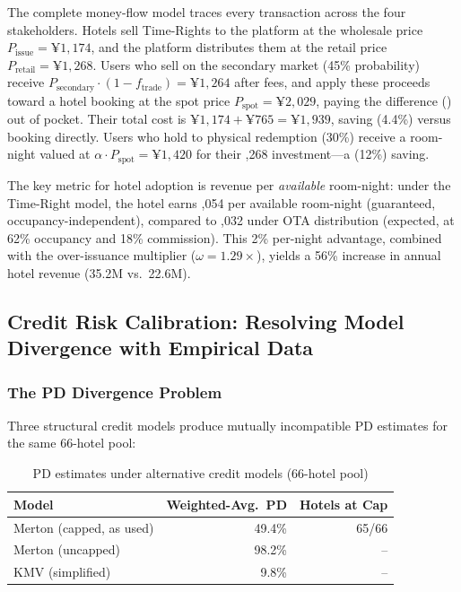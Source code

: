 \documentclass[12pt,a4paper]{article}
\begin{document}
The complete money-flow model traces every transaction across the four stakeholders.
Hotels sell Time-Rights to the platform at the wholesale price $P_{\text{issue}} = \yen 1,174$, and the platform distributes them at the retail price $P_{\text{retail}} = \yen 1,268$.
Users who sell on the secondary market (45\% probability) receive $P_{\text{secondary}} \cdot (1 - f_{\text{trade}}) = \yen 1,264$ after fees, and apply these proceeds toward a hotel booking at the spot price $P_{\text{spot}} = \yen 2,029$, paying the difference () out of pocket.
Their total cost is $\yen 1,174 + \yen 765 = \yen 1,939$, saving  (4.4\%) versus booking directly.
Users who hold to physical redemption (30\%) receive a room-night valued at $\alpha \cdot P_{\text{spot}} = \yen 1,420$ for their ,268 investment---a  (12\%) saving.

The key metric for hotel adoption is revenue per \emph{available} room-night: under the Time-Right model, the hotel earns ,054 per available room-night (guaranteed, occupancy-independent), compared to ,032 under OTA distribution (expected, at 62\% occupancy and 18\% commission).
This 2\% per-night advantage, combined with the over-issuance multiplier ($\omega=1.29\times$), yields a 56\% increase in annual hotel revenue (\yen 35.2M vs.\ \yen 22.6M).

\subsection{Credit Risk Calibration: Resolving Model Divergence with Empirical Data}

\subsubsection{The PD Divergence Problem}

Three structural credit models produce mutually incompatible PD estimates for the same 66-hotel pool:

\begin{table}[H]
\centering
\caption{PD estimates under alternative credit models (66-hotel pool)}
\label{tab:pd-comparison}
\begin{tabular}{@{}lrr@{}}
\toprule
\textbf{Model} & \textbf{Weighted-Avg.\ PD} & \textbf{Hotels at Cap} \\
\midrule
Merton (capped, as used)  & 49.4\% & 65/66 \\
Merton (uncapped)         & 98.2\% & -- \\
KMV (simplified)          &  9.8\% & -- \\
\bottomrule
\end{tabular}
\end{table}
\end{document}
